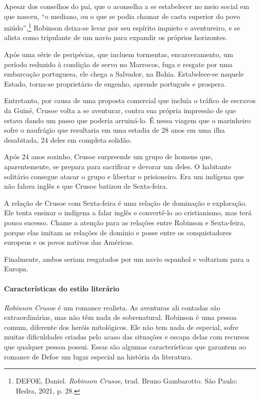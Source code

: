 \documentclass[12pt]{extarticle}
\begin{document}
Apesar dos conselhos do pai, que o aconselha a se estabelecer no meio
social em que nasceu, ``o mediano, ou o que se podia chamar de casta
superior do povo miúdo'',\footnote{DEFOE, Daniel. \emph{Robinson
  Crusoe}, trad. Bruno Gambarotto. São Paulo: Hedra, 2021, p. 28.}
Robinson deixa-se levar por seu espírito inquieto e aventureiro, e se
alista como tripulante de um navio para expandir os próprios horizontes.

Após uma série de peripécias, que incluem tormentas, encarceramento, um
período reduzido à condição de servo no Marrocos, fuga e resgate por uma
embarcação portuguesa, ele chega a Salvador, na Bahia. Estabelece-se
naquele Estado, torna-se proprietário de engenho, aprende português e
prospera.

Entretanto, por causa de uma proposta comercial que incluía o tráfico de
escravos da Guiné, Crusoe volta a se aventurar, contra sua própria
impressão de que estava dando um passo que poderia arruiná-lo. É nessa
viagem que o marinheiro sofre o naufrágio que resultaria em uma estadia
de 28 anos em uma ilha desabitada, 24 deles em completa solidão.


Após 24 anos sozinho, Crusoe surpreende um grupo de homens que,
aparentemente, se prepara para sacrificar e devorar um deles. O
habitante solitário consegue atacar o grupo e libertar o prisioneiro.
Era um indígena que não falava inglês e que Crusoe batizou de
Sexta-feira.

A relação de Crusoe com Sexta-feira é uma relação de dominação e
exploração. Ele tenta ensinar o indígena a falar inglês e convertê-lo ao
cristianismo, mas terá pouco sucesso. Chame a atenção para as relações
entre Robinson e Sexta-feira, porque elas imitam as relações de domínio
e posse entre os conquistadores europeus e os povos nativos das
Américas.

Finalmente, ambos seriam resgatados por um navio espanhol e voltariam
para a Europa.



\paragraph{Características do estilo literário}
\emph{Robinson Crusoe} é um romance realista. As aventuras ali contadas
são extraordinárias, mas não têm nada de sobrenatural. Robinson é uma
pessoa comum, diferente dos heróis mitológicos. Ele não tem nada de
especial, sofre muitas dificuldades criadas pelo acaso das situações e
escapa delas com recursos que qualquer pessoa possui. Essas são algumas
características que garantem ao romance de Defoe um lugar especial na
história da literatura.
\end{document}
